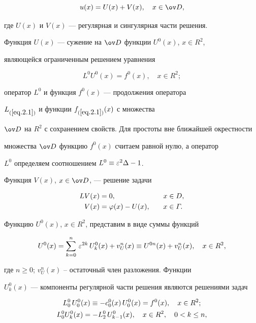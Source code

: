 \begin{equation}\label{eq.7.1}


u(x)=U(x)+V(x),\quad x\in\od,


\end{equation}


где $U(x)$ и $V(x)$ --- регулярная и сингулярная части решения.


Функция $U(x)$ --- сужение на $\od$ функции $U^0(x)$, $x\in R^2$,


являющейся ограниченным решением уравнения


$$


L^0U^0(x)=f^0(x), \quad x\in R^2;


$$


оператор $L^0$ и функция $f^0(x)$ --- продолжения оператора


$L_{(\ref{eq.2.1})}$ и функции $f_{(\ref{eq.2.1})}(x)$ с множества


$\od$ на $R^2$ с сохранением свойств. Для простоты вне ближайшей окрестности


множества $\od$ функцию $f^0(x)$ считаем равной нулю, а оператор


$L^0$ определяем соотношением $L^0\equiv \varepsilon^2\Delta -1$.


Функция $V(x)$, $x\in\od$, --- решение задачи


\begin{alignat*}{2}


LV(x) &= 0, &\quad x&\in D,\\


V(x) &= \vp(x)-U(x), &\quad x&\in\varGamma.


\end{alignat*}





Функцию $U^0(x)$, $x\in R^{2}$, представим в виде суммы функций


$$


U^0(x)=\sum_{k=0}^{n}\,\eps^{2k}\,U^0_k(x)+v_{U}^n(x) \eq


U^{0n}(x)+v_{U}^n(x), \quad x \in R^{2},


$$


где $n \ge 0$; $v_{U}^n(x)$ -- остаточный член разложения. Функции


$U^0_k(x)$ --- компоненты регулярной части решения являются решениями задач


\begin{gather*}


L_0^0\,U^0_0(x) \eq - c_0^{0}(x) \,U^0_0(x)=f^0(x), \quad 


x \in R^{2}; \\


L_0^0U^0_k(x) = -L_2^0\,U_{k-1}^0(x), \quad 


x \in R^{2}, \quad 0<k\le n,


\end{gather*}


